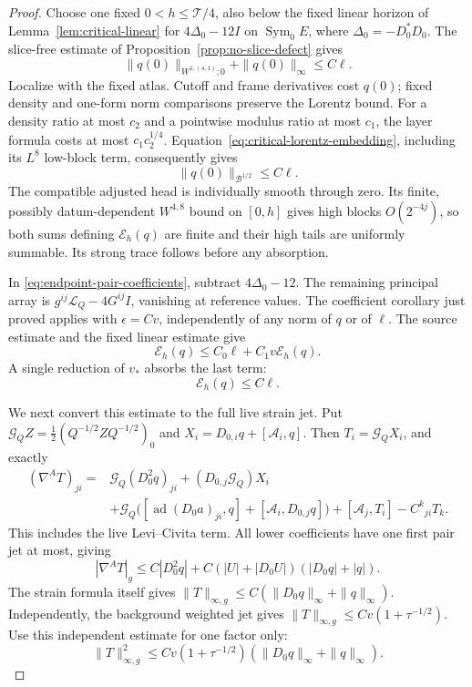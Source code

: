 \documentclass[11pt]{article}
\numberwithin{equation}{section}
\theoremstyle{definition}
\theoremstyle{remark}
\begin{document}
\begin{proof}
Choose one fixed \(0<h\le\mathcal T/4\), also below
the fixed linear horizon of Lemma~\ref{lem:critical-linear}
for \(4\Delta_0-12I\) on \(\operatorname{Sym}_0E\),
where \(\Delta_0=-D_0^*D_0\).
The slice-free estimate of
Proposition~\ref{prop:no-slice-defect} gives
\[
 \|q(0)\|_{W^{1,(4,1)};0}+\|q(0)\|_\infty\le C\ell .
\]
Localize with the fixed atlas. Cutoff and frame
derivatives cost \(q(0)\); fixed density and one-form
norm comparisons preserve the Lorentz bound.
For a density ratio at most \(c_2\) and a pointwise
modulus ratio at most \(c_1\), the layer formula costs
at most \(c_1c_2^{1/4}\).
Equation~\eqref{eq:critical-lorentz-embedding}, including
its \(L^8\) low-block term, consequently gives
\[
                         \|q(0)\|_{\mathcal B^{1/2}}\le C\ell .
\]
The compatible adjusted head is individually smooth
through zero. Its finite, possibly datum-dependent
\(W^{4,8}\) bound on \([0,h]\) gives high blocks
\(O(2^{-4j})\), so both sums defining
\(\mathcal E_h(q)\) are finite and their high tails
are uniformly summable. Its strong trace follows
before any absorption.

In \eqref{eq:endpoint-pair-coefficients}, subtract
\(4\Delta_0-12\). The remaining principal array is
\(g^{ij}\mathscr L_Q-4G^{ij}I\), vanishing at reference
values. The coefficient corollary just proved applies
with \(\epsilon=Cv\), independently of any norm of \(q\)
or of \(\ell\). The source estimate and the fixed linear
estimate give
\[
 \mathcal E_h(q)\le C_0\ell+C_1v\mathcal E_h(q).
\]
A single reduction of \(v_*\) absorbs the last term:
\begin{equation}\label{eq:endpoint-head-path}
                         \mathcal E_h(q)\le C\ell .
\end{equation}

We next convert this estimate to the full live strain jet.
Put \(\mathcal G_QZ=\tfrac12(Q^{-1/2}ZQ^{-1/2})_0\)
and \(X_i=D_{0,i}q+[\mathcal A_i,q]\).
Then \(T_i=\mathcal G_QX_i\), and exactly
\[
 \begin{split}
 (\nabla^AT)_{ji}={}&\mathcal G_Q(D_0^2q)_{ji}
 +(D_{0,j}\mathcal G_Q)X_i\\
 &+\mathcal G_Q\bigl([\operatorname{ad}(D_0a)_{ji},q]
                     +[\mathcal A_i,D_{0,j}q]\bigr)
 +[\mathcal A_j,T_i]-C^k{}_{ji}T_k .
 \end{split}
\]
This includes the live Levi--Civita term. All lower
coefficients have one first pair jet at most, giving
\[
 |\nabla^AT|_g\le C|D_0^2q|
             +C(|U|+|D_0U|)(|D_0q|+|q|).
\]
The strain formula itself gives
\(\|T\|_{\infty,g}\le C(\|D_0q\|_\infty+\|q\|_\infty)\).
Independently, the background weighted jet gives
\(\|T\|_{\infty,g}\le Cv(1+\tau^{-1/2})\).
Use this independent estimate for one factor only:
\[
 \|T\|_{\infty,g}^2
 \le Cv(1+\tau^{-1/2})
                  (\|D_0q\|_\infty+\|q\|_\infty).
\]


\end{proof}
\end{document}
